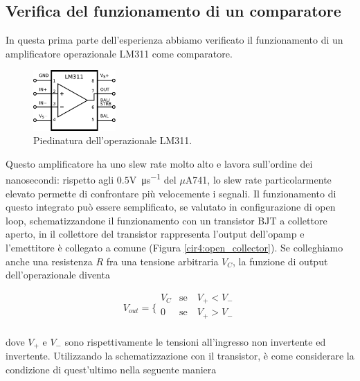\subsection{Verifica del funzionamento di un comparatore}

In questa prima parte dell'esperienza abbiamo verificato il funzionamento di un amplificatore operazionale LM311 come comparatore.

\begin{figure}
  \begin{center}
    \includegraphics[width=0.280\textwidth]{../E04/latex/LM311.pdf}
  \end{center}
  \caption{Piedinatura dell'operazionale LM311.}
  \label{cir4:piedinatura_LM311}
\end{figure}

Questo amplificatore ha uno slew rate molto alto e lavora sull'ordine dei nanosecondi: rispetto agli $0.5$\si{\volt\per\micro\second} del $\mu$A741, lo slew rate particolarmente elevato permette di confrontare più velocemente i segnali.
Il funzionamento di questo integrato può essere semplificato, se valutato in configurazione di open loop, schematizzandone il funzionamento con un transistor BJT a collettore aperto, in il collettore del transistor rappresenta l'output dell'opamp e l'emettitore è collegato a comune (Figura \ref{cir4:open_collector}).
Se colleghiamo anche una resistenza $R$ fra una tensione arbitraria $V_C$, la funzione di output dell'operazionale diventa

\begin{equation}
V_{out} = \bigg \{
\begin{array}{rl}
V_C & \mathrm{se} \quad V_+ < V_- \\
0 & \mathrm{se} \quad V_+ > V_- \\
\end{array}
\label{eq4:comparatore}
\end{equation}

dove $V_+$ e $V_-$ sono rispettivamente le tensioni all'ingresso non invertente ed invertente. Utilizzando la schematizzazione con il transistor, è come considerare la condizione di quest'ultimo nella seguente maniera

